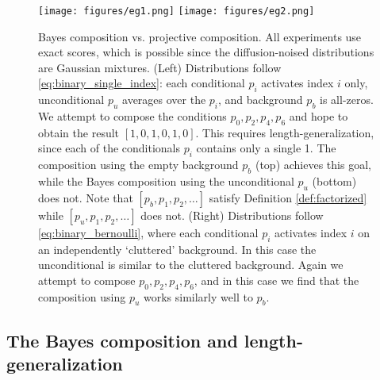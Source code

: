 \begin{figure}[ht]
\vskip 0.2in
\begin{center}
\centerline{
\texttt{[image: figures/eg1.png]}
\vline
\texttt{[image: figures/eg2.png]}
}
\caption{Bayes composition vs. projective composition. All experiments use exact scores, which is possible since the diffusion-noised distributions are Gaussian mixtures. (Left) Distributions follow \eqref{eq:binary_single_index}: each conditional $p_i$ activates index $i$ only, unconditional $p_u$ averages over the $p_i$, and background $p_b$ is all-zeros. We attempt to compose the conditions $p_0, p_2, p_4, p_6$ and hope to obtain the result $[1, 0, 1, 0, 1, 0]$. This requires length-generalization, since each of the conditionals $p_i$ contains only a single 1. The composition using the empty background $p_b$ (top) achieves this goal, while the Bayes composition using the unconditional $p_u$ (bottom) does not. Note that $[p_b, p_1, p_2, \ldots]$ satisfy Definition \ref{def:factorized} while $[p_u, p_1, p_2, \ldots]$ does not. (Right) Distributions follow \eqref{eq:binary_bernoulli}, where each conditional $p_i$ activates index $i$ on an independently `cluttered' background. In this case the unconditional is similar to the cluttered background. Again we attempt to compose $p_0, p_2, p_4, p_6$, and in this case we find that the composition using $p_u$ works similarly well to $p_b$.}
\label{fig:bayes_binary}
\end{center}
\vskip -0.2in
\end{figure}

\subsection{The Bayes composition and length-generalization}
\label{app:bayes_counterex}

